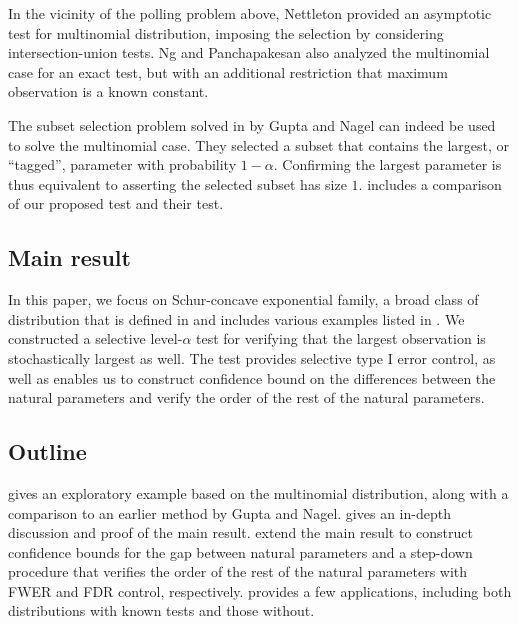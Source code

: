 \documentclass[11pt]{article}
\newcommand{\WFcomment}[1]{{\color{red}{(WF: \bf \sc #1) }}}
\newcommand{\KHcomment}[1]{{\color{green!60!black}{(KH: \bf \sc #1) }}}
\begin{document}
In the vicinity of the polling problem above, Nettleton \cite{Nettleton:2009ht} provided an asymptotic test for multinomial distribution, imposing the selection by considering intersection-union tests. Ng and Panchapakesan \cite{Ng:2007cn} also analyzed the multinomial case for an exact test, but with an additional restriction that maximum observation is a known constant.

The subset selection problem solved in \cite{Gupta:1967wg} by Gupta and Nagel can indeed be used to solve the multinomial case. They selected a subset that contains the largest, or ``tagged'', parameter with probability $1-\alpha$. Confirming the largest parameter is thus equivalent to asserting the selected subset has size $1$.  includes a comparison of our proposed test and their test.

\subsection{Main result}

In this paper, we focus on Schur-concave exponential family, a broad class of distribution that is defined in  and includes various examples listed in . We constructed a selective level-$\alpha$ test for verifying that the largest observation is stochastically largest as well. The test provides selective type I error control, as well as enables us to construct confidence bound on the differences between the natural parameters and verify the order of the rest of the natural parameters. \WFcomment{Still feels a bit abstract when you discuss these goals here.} \KHcomment{What if we don't mention the side results at all?}

\subsection{Outline}

 gives an exploratory example based on the multinomial distribution, along with a comparison to an earlier method by Gupta and Nagel.  gives an in-depth discussion and proof of the main result.  extend the main result to construct confidence bounds for the gap between natural parameters and a step-down procedure that verifies the order of the rest of the natural parameters with FWER and FDR control, respectively.  provides a few applications, including both distributions with known tests and those without.
\end{document}

